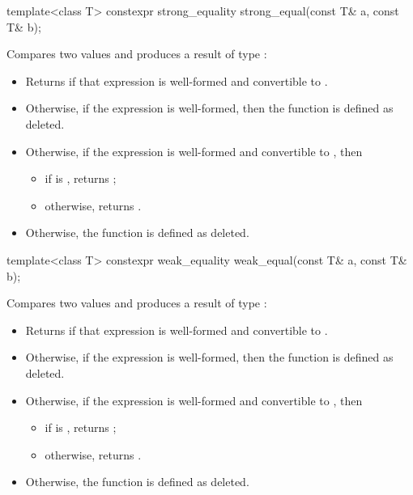 %
\begin{itemdecl}
template<class T> constexpr strong_equality strong_equal(const T& a, const T& b);
\end{itemdecl}

\begin{itemdescr}
\pnum
\effects
Compares two values and produces a result of type :

\begin{itemize}
\item
Returns  if that expression is well-formed and
convertible to .
\item
Otherwise, if the expression  is well-formed,
then the function is defined as deleted.
\item
Otherwise, if the expression 
is well-formed and convertible to , then
\begin{itemize}
\item
if  is ,
returns ;
\item
otherwise, returns .
\end{itemize}
\item
Otherwise, the function is defined as deleted.
\end{itemize}
\end{itemdescr}

%
\begin{itemdecl}
template<class T> constexpr weak_equality weak_equal(const T& a, const T& b);
\end{itemdecl}

\begin{itemdescr}
\pnum
\effects
Compares two values and produces a result of type :

\begin{itemize}
\item
Returns  if that expression is well-formed and
convertible to .
\item
Otherwise, if the expression  is well-formed,
then the function is defined as deleted.
\item
Otherwise, if the expression 
is well-formed and convertible to , then
\begin{itemize}
\item
if  is ,
returns ;
\item
otherwise, returns .
\end{itemize}
\item
Otherwise, the function is defined as deleted.
\end{itemize}
\end{itemdescr}

